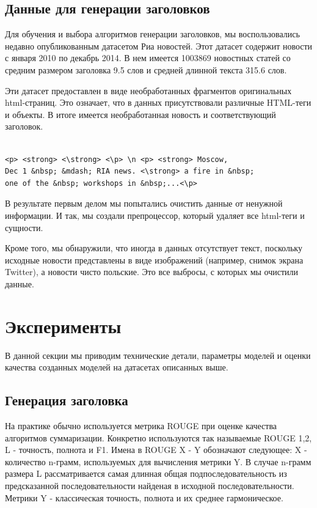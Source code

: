 \documentclass[14pt]{matmex-diploma-custom}
\begin{document}

\subsection{Данные для генерации заголовков}

Для обучения и выбора алгоритмов генерации заголовков, мы воспользовались недавно опубликованным
датасетом Риа новостей. Этот датасет содержит новости с января 2010 по декабрь 2014.
В нем имеется 1003869 новостных статей со средним размером заголовка 9.5 слов и
средней длинной текста 315.6 слов.

Эти датасет предоставлен в виде необработанных фрагментов оригинальных html-страниц.
Это означает, что в данных присутствовали различные HTML-теги и объекты.
В итоге имеется необработанная новость и соответствующий заголовок.

\begin{verbatim}

<p> <strong> <\strong> <\p> \n <p> <strong> Moscow,
Dec 1 &nbsp; &mdash; RIA news. <\strong> a fire in &nbsp;
one of the &nbsp; workshops in &nbsp;...<\p>
\end{verbatim}

В результате первым делом мы попытались очистить данные от ненужной информации. И так, мы создали препроцессор, который удаляет все html-теги и сущности.

Кроме того, мы обнаружили, что иногда в данных отсутствует текст, поскольку исходные новости представлены в виде изображений (например, снимок экрана Twitter), а новости чисто польские. Это все выбросы, с которых мы очистили данные.


\section{Эксперименты}
В данной секции мы приводим технические детали, параметры моделей и оценки качества созданных моделей на датасетах описанных выше.

\subsection{Генерация заголовка}
На практике обычно используется метрика ROUGE \cite{Lin:2004} при оценке качества алгоритмов суммаризации. Конкретно используются так называемые ROUGE 1,2, L - точность, полнота и F1. Имена в ROUGE X - Y обозначают следующее: X - количество n-грамм, используемых для вычисления метрики Y. В случае n-грамм размера L рассматривается самая длинная общая подпоследовательность из предсказанной последовательности найденая в исходной последовательности. Метрики Y - классическая точность, полнота и их среднее гармоническое.
\end{document}
